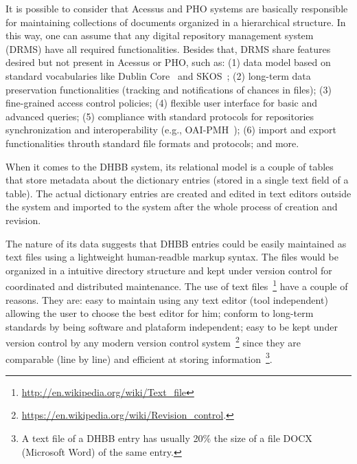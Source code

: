 
It is possible to consider that Acessus and PHO systems are basically
responsible for maintaining collections of documents organized in a
hierarchical structure. In this way, one can assume that any digital
repository management system (DRMS) have all required
functionalities. Besides that, DRMS share features desired but not
present in Acessus or PHO, such as: (1) data model based on standard
vocabularies like Dublin Core~\cite{dc} and SKOS~\cite{skos}; (2)
long-term data preservation functionalities (tracking and
notifications of chances in files); (3) fine-grained access control
policies; (4) flexible user interface for basic and advanced queries;
(5) compliance with standard protocols for repositories
synchronization and interoperability (e.g., OAI-PMH~\cite{oai}); (6)
import and export functionalities throuth standard file formats and
protocols; and more.

When it comes to the DHBB system, its relational model is a couple of
tables that store metadata about the dictionary entries (stored in a
single text field of a table). The actual dictionary entries are
created and edited in text editors outside the system and imported to
the system after the whole process of creation and revision. 


The nature of its data suggests that DHBB entries could be easily
maintained as text files using a lightweight human-readble markup
syntax. The files would be organized in a intuitive directory
structure and kept under version control for coordinated and
distributed maintenance. The use of text
files~\footnote{\url{http://en.wikipedia.org/wiki/Text_file}} have a
couple of reasons. They are: easy to maintain using any text editor
(tool independent) allowing the user to choose the best editor for
him; conform to long-term standards by being software and plataform
independent; easy to be kept under version control by any modern
version control
system~\footnote{\url{https://en.wikipedia.org/wiki/Revision_control}.}
since they are comparable (line by line) and efficient at storing
information~\footnote{A text file of a DHBB entry has usually 20\% the
  size of a file DOCX (Microsoft Word) of the same entry.}.

